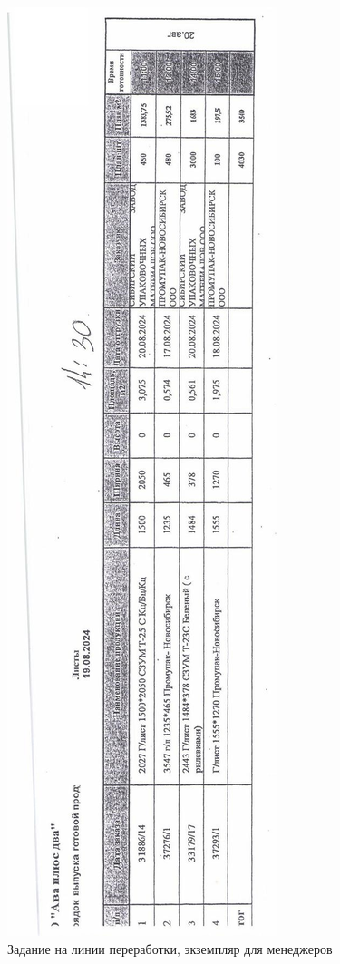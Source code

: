 \begin{figure}
\begin{center}
 \includegraphics[width=\linewidth, height=0.94\textheight, keepaspectratio]{Pics/d13.jpg}
\end{center}
 \caption{Задание на линии переработки, экземпляр для менеджеров}
 \label{pic:d13}
\end{figure}


